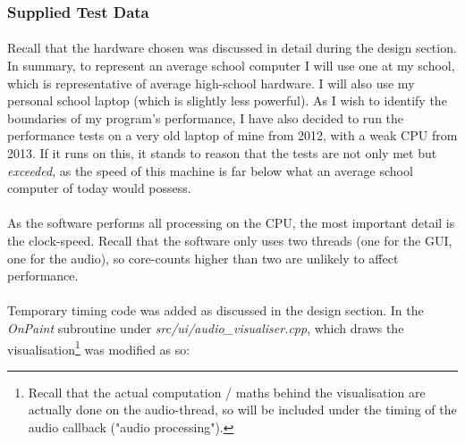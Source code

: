 \paragraph{}
{
	\centering
}

\subsubsection*{Supplied Test Data}
\paragraph{}
Recall that the hardware chosen was discussed in detail during the design section. In summary, to represent an average school computer I will use one at my school, which is representative of average high-school hardware. I will also use my personal school laptop (which is slightly less powerful). As I wish to identify the boundaries of my program's performance, I have also decided to run the performance tests on a very old laptop of mine from 2012, with a weak CPU from 2013. If it runs on this, it stands to reason that the tests are not only met but \textit{exceeded}, as the speed of this machine is far below what an average school computer of today would possess.  

\paragraph{}
As the software performs all processing on the CPU, the most important detail is the clock-speed. Recall that the software only uses two threads (one for the GUI, one for the audio), so core-counts higher than two are unlikely to affect performance.

\paragraph{}
Temporary timing code was added as discussed in the design section. In the \textit{OnPaint} subroutine under \textit{src/ui/audio\_visualiser.cpp}, which draws the visualisation\footnote{
	Recall that the actual computation / maths behind the visualisation are actually done on the audio-thread, so will be included under the timing of the audio callback ("audio processing").
} was modified as so:

